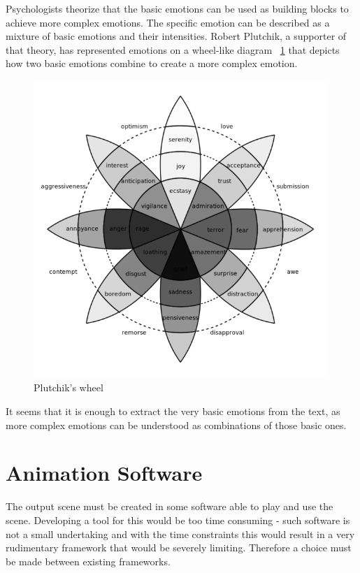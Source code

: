 Psychologists theorize that the basic emotions can be used as building blocks to achieve more complex emotions. The specific emotion can be described as a mixture of basic emotions and their intensities. Robert Plutchik, a supporter of that theory, has represented emotions on a wheel-like diagram ~\ref{fig:wheel} that depicts how two basic emotions combine to create a more complex emotion.~\cite{basicemo}

\begin{figure}[H]
\centerline{\includegraphics[width = 30em]{img/wheel.png}}
\caption{Plutchik's wheel}\label{fig:wheel}
\end{figure}

It seems that it is enough to extract the very basic emotions from the text, as more complex emotions can be understood as combinations of those basic ones.


\section{Animation Software}
\label{sec:animchoice}

The output scene must be created in some software able to play and use the scene. Developing a tool for this would be too time consuming - such software is not a small undertaking and with the time constraints this would result in a very rudimentary framework that would be severely limiting. Therefore a choice must be made between existing frameworks.

